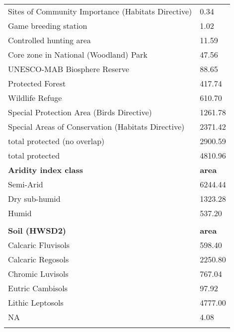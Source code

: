 \begin{longtable}{ll}
Sites of Community Importance (Habitats Directive) & 0.34             \\
Game breeding station                              & 1.02             \\
Controlled hunting area                            & 11.59            \\
Core zone in National (Woodland) Park              & 47.56            \\
UNESCO-MAB Biosphere Reserve                       & 88.65            \\
Protected Forest                                   & 417.74           \\
Wildlife Refuge                                    & 610.70           \\
Special Protection Area (Birds Directive)          & 1261.78          \\
Special Areas of Conservation (Habitats Directive) & 2371.42          \\
total protected (no overlap)                       & 2900.59          \\
total protected                                    & 4810.96          \\
\textbf{Aridity index class}                       & \textbf{area}    \\
Semi-Arid                                          & 6244.44          \\
Dry sub-humid                                      & 1323.28          \\
Humid                                              & 537.20           \\
                                                   &                  \\
\textbf{Soil (HWSD2)}                              & \textbf{area}    \\
Calcaric Fluvisols                                 & 598.40           \\
Calcaric Regosols                                  & 2250.80          \\
Chromic Luvisols                                   & 767.04           \\
Eutric Cambisols                                   & 97.92            \\
Lithic Leptosols                                   & 4777.00          \\
NA                                                 & 4.08             \\
                                                   &                  \\

\end{longtable}
